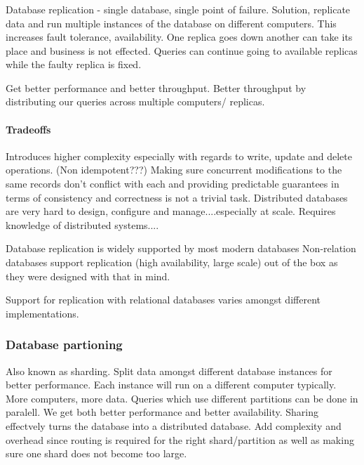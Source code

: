\documentclass[a4paper, 11pt]{book}
\begin{document}
    \subsubsection{}
    Database replication - single database, single point of failure.
    Solution, replicate data and run multiple instances of the database on different computers.
    This increases fault tolerance, availability.
    One replica goes down another can take its place and business is not effected.
    Queries can continue going to available replicas while the faulty replica is fixed.

    Get better performance and better throughput.
    Better throughput by distributing our queries across multiple computers/ replicas.

    \paragraph{Tradeoffs}
    Introduces higher complexity especially with regards to write, update and delete operations.
    (Non idempotent???)
    Making sure concurrent modifications to the same records don't conflict with each and providing predictable guarantees in terms of consistency and correctness is not a trivial task.
    Distributed databases are very hard to design, configure and manage....especially at scale.
    Requires knowledge of distributed systems....

    Database replication is widely supported by most modern databases
    Non-relation databases support replication (high availability, large scale) out of the box as they were designed with that in mind.

    Support for replication with relational databases varies amongst different implementations.

    \subsubsection{Database partioning}
    Also known as sharding.
    Split data amongst different database instances for better performance.
    Each instance will run on a different computer typically.
    More computers, more data.
    Queries which use different partitions can be done in paralell.
    We get both better performance and better availability.
    Sharing effectvely turns the database into a distributed database.
    Add complexity and overhead since routing is required for the right shard/partition as well as making sure one shard does not become too large.
\end{document}
